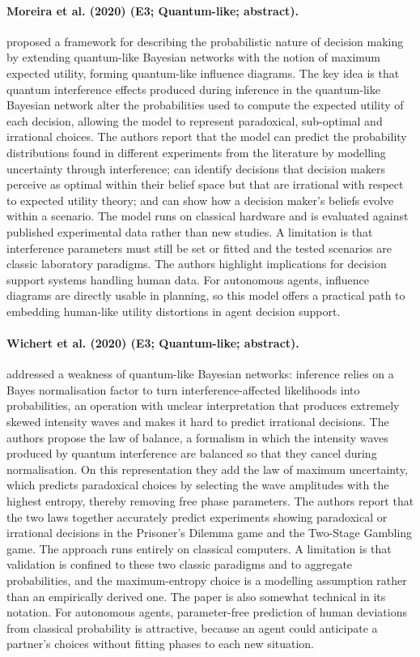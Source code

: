 \documentclass[10pt,a4paper]{article}
\begin{document}
\paragraph{Moreira et al. (2020) (E3; Quantum-like; abstract).} \citet{Moreira2020b} proposed a framework for describing the probabilistic nature of decision making by extending quantum-like Bayesian networks with the notion of maximum expected utility, forming quantum-like influence diagrams. The key idea is that quantum interference effects produced during inference in the quantum-like Bayesian network alter the probabilities used to compute the expected utility of each decision, allowing the model to represent paradoxical, sub-optimal and irrational choices. The authors report that the model can predict the probability distributions found in different experiments from the literature by modelling uncertainty through interference; can identify decisions that decision makers perceive as optimal within their belief space but that are irrational with respect to expected utility theory; and can show how a decision maker's beliefs evolve within a scenario. The model runs on classical hardware and is evaluated against published experimental data rather than new studies. A limitation is that interference parameters must still be set or fitted and the tested scenarios are classic laboratory paradigms. The authors highlight implications for decision support systems handling human data. For autonomous agents, influence diagrams are directly usable in planning, so this model offers a practical path to embedding human-like utility distortions in agent decision support.

\paragraph{Wichert et al. (2020) (E3; Quantum-like; abstract).} \citet{Wichert2020} addressed a weakness of quantum-like Bayesian networks: inference relies on a Bayes normalisation factor to turn interference-affected likelihoods into probabilities, an operation with unclear interpretation that produces extremely skewed intensity waves and makes it hard to predict irrational decisions. The authors propose the law of balance, a formalism in which the intensity waves produced by quantum interference are balanced so that they cancel during normalisation. On this representation they add the law of maximum uncertainty, which predicts paradoxical choices by selecting the wave amplitudes with the highest entropy, thereby removing free phase parameters. The authors report that the two laws together accurately predict experiments showing paradoxical or irrational decisions in the Prisoner's Dilemma game and the Two-Stage Gambling game. The approach runs entirely on classical computers. A limitation is that validation is confined to these two classic paradigms and to aggregate probabilities, and the maximum-entropy choice is a modelling assumption rather than an empirically derived one. The paper is also somewhat technical in its notation. For autonomous agents, parameter-free prediction of human deviations from classical probability is attractive, because an agent could anticipate a partner's choices without fitting phases to each new situation.
\end{document}
